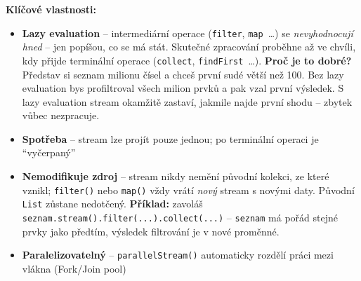 \textbf{Klíčové vlastnosti:}
\begin{itemize}
  \item \textbf{Lazy evaluation} -- intermediární operace (\texttt{filter}, \texttt{map}~\ldots) se
    \textit{nevyhodnocují hned} -- jen popíšou, co se má stát. Skutečné zpracování proběhne až
    ve chvíli, kdy přijde terminální operace (\texttt{collect}, \texttt{findFirst}~\ldots).
    \textbf{Proč je to dobré?} Představ si seznam milionu čísel a chceš první sudé větší než 100.
    Bez lazy evaluation bys profiltroval všech milion prvků a pak vzal první výsledek.
    S lazy evaluation stream okamžitě zastaví, jakmile najde první shodu -- zbytek vůbec nezpracuje.

  \item \textbf{Spotřeba} -- stream lze projít pouze jednou; po terminální operaci je ``vyčerpaný''

  \item \textbf{Nemodifikuje zdroj} -- stream nikdy nemění původní kolekci, ze které vznikl;
    \texttt{filter()} nebo \texttt{map()} vždy vrátí \textit{nový} stream s novými daty.
    Původní \texttt{List} zůstane nedotčený.
    \textbf{Příklad:} zavoláš \texttt{seznam.stream().filter(...).collect(...)} --
    \texttt{seznam} má pořád stejné prvky jako předtím, výsledek filtrování je v nové proměnné.
  \item \textbf{Paralelizovatelný} -- \texttt{parallelStream()} automaticky rozdělí práci mezi vlákna (Fork/Join pool)
\end{itemize}

